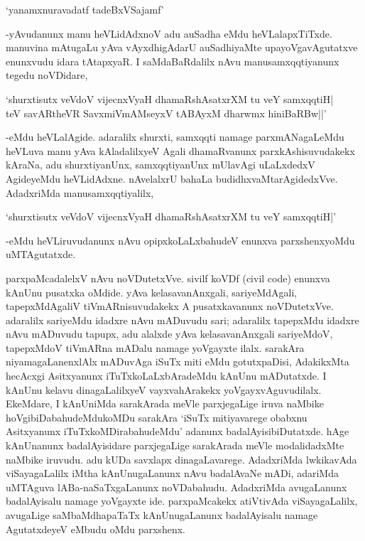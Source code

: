 \begin{shloka}
`yanamxnuravadatf tadeBxVSajamf'
\end{shloka}

-yAvudanunx manu heVLidAdxnoV adu auSadha eMdu heVLalapxTiTxde. manuvina mAtugaLu yAva vAyxdhigAdarU auSadhiyaMte upayoVgavAgutatxve enunxvudu idara tAtapxyaR. I saMdaBaRdalilx nAvu manusamxqqtiyanunx tegedu noVDidare,

\begin{shloka}
`shurxtisutx veVdoV vijecnxVyaH dhamaRshAsatxrXM tu veY samxqqtiH|\\
teV savARtheVR SavxmiVmAMseyxV tABAyxM dharwmx hiniBaRBw||'
\end{shloka}
 
-eMdu heVLalAgide. adaralilx shurxti, samxqqti namage parxmANagaLeMdu heVLuva manu yAva kAladalilxyeV Agali dhamaRvanunx parxkAshisuvudakekx kAraNa, adu shurxtiyanUnx, samxqqtiyanUnx mUlavAgi uLaLxdedxV AgideyeMdu heVLidAdxne. nAvelalxrU bahaLa budidhxvaMtarAgidedxVve. AdadxriMda manusamxqqtiyalilx,

\begin{shloka} 
`shurxtisutx veVdoV vijecnxVyaH dhamaRshAsatxrXM tu veY samxqqtiH|'
\end{shloka}

-eMdu heVLiruvudanunx nAvu opipxkoLaLxbahudeV enunxva parxshenxyoMdu uMTAgutatxde.

parxpaMcadalelxV nAvu noVDutetxVve. sivilf koVDf ({\rm civil code}) enunxva kAnUnu pusatxka oMdide. yAva kelasavanAnxgali, sariyeMdAgali, tapepxMdAgaliV tiVmARnisuvudakekx A pusatxkavanunx noVDutetxVve. adaralilx sariyeMdu idadxre nAvu mADuvudu sari; adaralilx tapepxMdu idadxre nAvu mADuvudu tapupx, adu alalxde yAva kelasavanAnxgali sariyeMdoV, tapepxMdoV tiVmARna mADalu namage yoVgayxte ilalx. sarakAra niyamagaLanenxlAlx mADuvAga iSuTx miti eMdu gotutxpaDisi, AdakikxMta hecAcxgi Asitxyanunx iTuTxkoLaLxbAradeMdu kAnUnu mADutatxde. I kAnUnu kelavu dinagaLalilxyeV vayxvahArakekx yoVgayxvAguvudilalx. EkeMdare, I kAnUniMda sarakArada meVle parxjegaLige iruva naMbike hoVgibiDabahudeMdukoMDu sarakAra `iSuTx mitiyavarege obabxnu Asitxyanunx iTuTxkoMDirabahudeMdu' adanunx badalAyisibiDutatxde. hAge kAnUnanunx badalAyisidare parxjegaLige sarakArada meVle modalidadxMte naMbike iruvudu. adu kUDa savxlapx dinagaLavarege. AdadxriMda lwkikavAda viSayagaLalilx iMtha kAnUnugaLanunx nAvu badalAvaNe mADi, adariMda uMTAguva lABa-naSaTxgaLanunx noVDabahudu. AdadxriMda avugaLanunx badalAyisalu namage yoVgayxte ide. parxpaMcakekx atiVtivAda viSayagaLalilx, avugaLige saMbaMdhapaTaTx kAnUnugaLanunx badalAyisalu namage AgutatxdeyeV eMbudu oMdu parxshenx.

